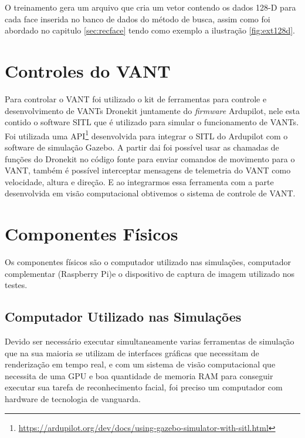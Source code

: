 O treinamento gera um arquivo que cria um vetor contendo os dados 128-D para cada face inserida no banco de dados do método de busca, assim como foi abordado no capitulo \ref{sec:recface} tendo como exemplo a ilustração \ref{fig:ext128d}.

\section{Controles do VANT}

Para controlar o VANT foi utilizado o kit de ferramentas para controle e desenvolvimento de VANTs Dronekit juntamente do \textit{firmware} Ardupilot, nele esta contido o software SITL que é utilizado para simular o funcionamento de VANTs. Foi utilizada uma API\footnote{\url{https://ardupilot.org/dev/docs/using-gazebo-simulator-with-sitl.html}} desenvolvida para integrar o SITL do Ardupilot com o software de simulação Gazebo.
A partir dai foi possível usar as chamadas de funções do Dronekit no código fonte para enviar comandos de movimento para o VANT, também é possível interceptar mensagens de telemetria do VANT como velocidade, altura e direção. E ao integrarmos essa ferramenta com a parte desenvolvida em visão computacional obtivemos o sistema de controle de VANT.


\section{Componentes Físicos}

Os componentes físicos são o computador utilizado nas simulações, computador complementar (Raspberry Pi)e o dispositivo de captura de imagem utilizado nos testes.

\subsection{Computador Utilizado nas Simulações}
\label{subsec:compsim}

Devido ser necessário executar simultaneamente varias ferramentas de simulação que na sua maioria se utilizam de interfaces gráficas que necessitam de renderização em tempo real, e com um sistema de visão computacional que necessita de uma GPU e boa quantidade de memoria RAM para conseguir executar sua tarefa de reconhecimento facial, foi preciso um computador com hardware de tecnologia de vanguarda.

